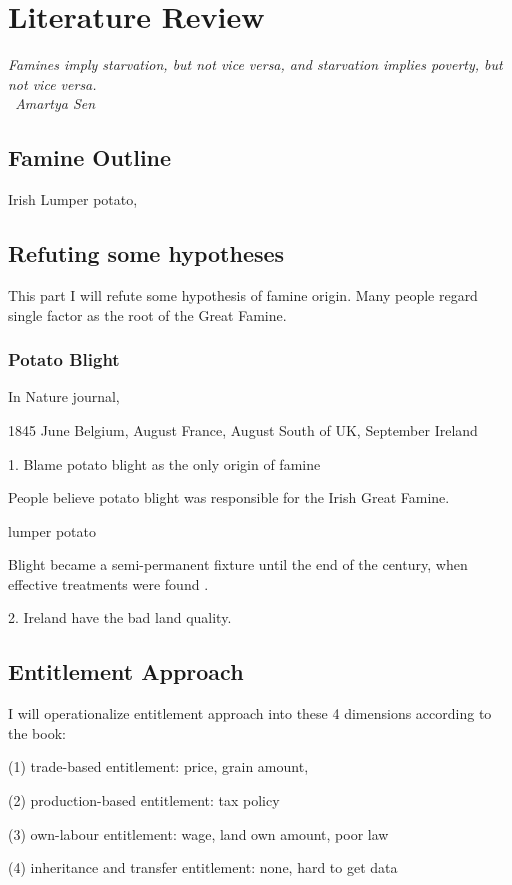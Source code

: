 \chapter{Literature Review}

\vspace{.3cm}

\textit{Famines imply starvation, but not vice versa, and starvation implies poverty, but not vice versa.\\
\textemdash\ Amartya Sen}

\section{Famine Outline}

Irish Lumper potato, 

\section{Refuting some hypotheses}

This part I will refute some hypothesis of famine origin. Many people regard single factor as the root of the Great Famine.

\subsection{Potato Blight}

In Nature journal,

1845 June Belgium, August France, August South of UK, September Ireland





1. Blame potato blight as the only origin of famine

People believe potato blight was responsible for the Irish Great Famine. 

lumper potato

Blight became a semi-permanent fixture until the end of the century, when effective treatments were found \citep{o1994economic}.

2. Ireland have the bad land quality.

\section{Entitlement Approach}

I will operationalize entitlement approach into these 4 dimensions according to the book:

(1) trade-based entitlement: price, grain amount, 

(2) production-based entitlement: tax policy

(3) own-labour entitlement: wage, land own amount, poor law

(4) inheritance and transfer entitlement: none, hard to get data



